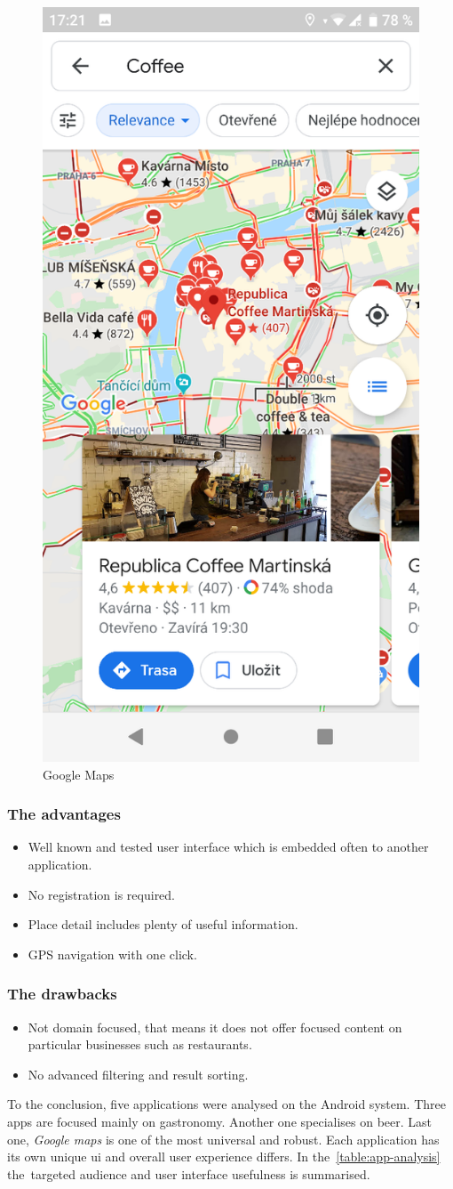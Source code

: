 \begin{figure}[ht]
    \centering
    \includegraphics[width=0.33\linewidth]{img/analysis/gmaps.png}
    \caption{Google Maps \cite{app-google-maps}}
    \label{fig:google-maps}
\end{figure}

\subsubsection{The advantages}
\begin{itemize}
    \item Well known and tested user interface which is embedded often to another application.
    \item No registration is required.
    \item Place detail includes plenty of useful information.
    \item GPS navigation with one click.
\end{itemize}

\subsubsection{The drawbacks}
\begin{itemize}
    \item Not domain focused, that means it does not offer focused content on particular businesses such as restaurants.
    \item No advanced filtering and result sorting.
\end{itemize}

To the conclusion, five applications were analysed on the Android system. Three apps are focused mainly on gastronomy. Another one specialises on beer. Last one, \textit{Google maps} is one of the most universal and robust. 
Each application has its own unique \gls{ui} and overall user experience differs. In the~\cref{table:app-analysis} the~targeted audience and user interface usefulness is summarised.

